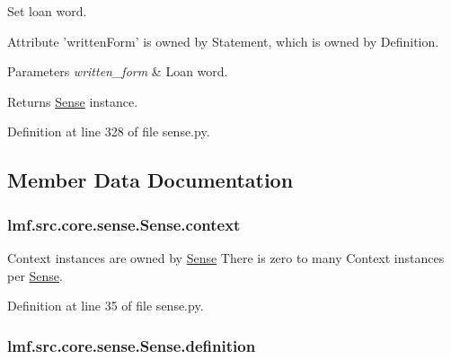 Set loan word. 

Attribute 'written\+Form' is owned by Statement, which is owned by Definition. 
\begin{DoxyParams}{Parameters}
{\em written\+\_\+form} & Loan word. \\
\hline
\end{DoxyParams}
\begin{DoxyReturn}{Returns}
\hyperlink{classlmf_1_1src_1_1core_1_1sense_1_1_sense}{Sense} instance. 
\end{DoxyReturn}


Definition at line 328 of file sense.\+py.



\subsection{Member Data Documentation}
\hypertarget{classlmf_1_1src_1_1core_1_1sense_1_1_sense_ae2b3da0233748116d4415cc107b6e4c2}{
\subsubsection[{context}]{\setlength{\rightskip}{0pt plus 5cm}lmf.\+src.\+core.\+sense.\+Sense.\+context}}\label{classlmf_1_1src_1_1core_1_1sense_1_1_sense_ae2b3da0233748116d4415cc107b6e4c2}


Context instances are owned by \hyperlink{classlmf_1_1src_1_1core_1_1sense_1_1_sense}{Sense} There is zero to many Context instances per \hyperlink{classlmf_1_1src_1_1core_1_1sense_1_1_sense}{Sense}. 



Definition at line 35 of file sense.\+py.

\hypertarget{classlmf_1_1src_1_1core_1_1sense_1_1_sense_a9adfd8936ecd6626cba82193e068e09e}{
\subsubsection[{definition}]{\setlength{\rightskip}{0pt plus 5cm}lmf.\+src.\+core.\+sense.\+Sense.\+definition}}\label{classlmf_1_1src_1_1core_1_1sense_1_1_sense_a9adfd8936ecd6626cba82193e068e09e}


